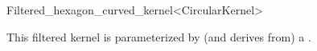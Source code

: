 \begin{ccRefClass}{Filtered_hexagon_curved_kernel<CircularKernel>}

\ccDefinition



\ccParameters

This filtered kernel is parameterized by (and derives from) a . 

\end{ccRefClass}
